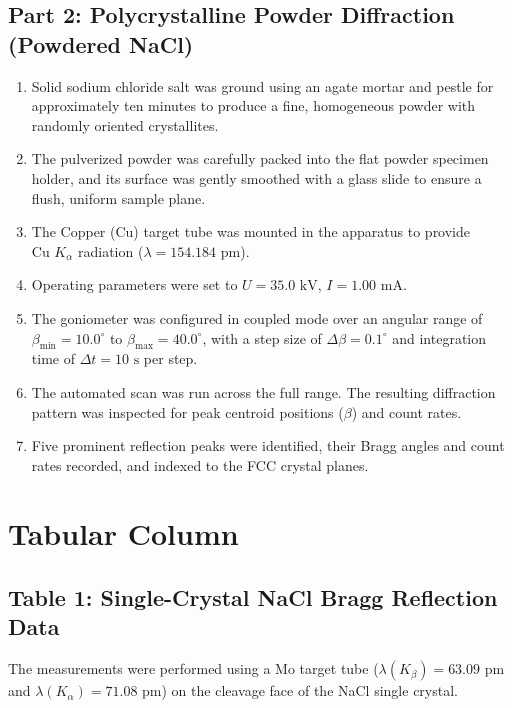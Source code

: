 \documentclass[12pt,a4paper]{article}
\begin{document}
\subsection{Part 2: Polycrystalline Powder Diffraction (Powdered NaCl)}
\begin{enumerate}
    \item Solid sodium chloride salt was ground using an agate mortar and pestle for approximately ten minutes to produce a fine, homogeneous powder with randomly oriented crystallites.
    \item The pulverized powder was carefully packed into the flat powder specimen holder, and its surface was gently smoothed with a glass slide to ensure a flush, uniform sample plane.
    \item The Copper (Cu) target tube was mounted in the apparatus to provide $\text{Cu } K_\alpha$ radiation ($\lambda = 154.184\text{ pm}$).
    \item Operating parameters were set to $U = 35.0\text{ kV}$, $I = 1.00\text{ mA}$.
    \item The goniometer was configured in coupled mode over an angular range of $\beta_{\min} = 10.0^\circ$ to $\beta_{\max} = 40.0^\circ$, with a step size of $\Delta\beta = 0.1^\circ$ and integration time of $\Delta t = 10\text{ s}$ per step.
    \item The automated scan was run across the full range. The resulting diffraction pattern was inspected for peak centroid positions ($\beta$) and count rates.
    \item Five prominent reflection peaks were identified, their Bragg angles and count rates recorded, and indexed to the FCC crystal planes.
\end{enumerate}

\newpage

\section{Tabular Column}

\subsection{Table 1: Single-Crystal NaCl Bragg Reflection Data}
The measurements were performed using a Mo target tube ($\lambda(K_\beta) = 63.09\text{ pm}$ and $\lambda(K_\alpha) = 71.08\text{ pm}$) on the cleavage face of the NaCl single crystal.
\end{document}
